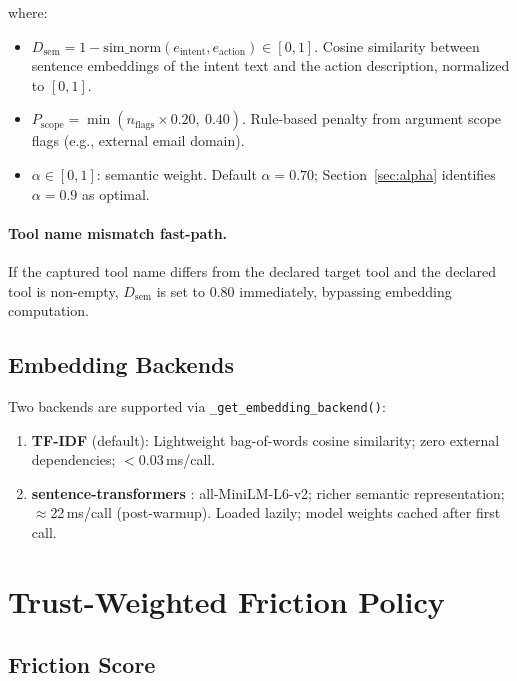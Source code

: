 \documentclass[11pt,letterpaper]{article}
\begin{document}
where:

\begin{itemize}
  \item $D_{\mathrm{sem}} = 1 - \mathrm{sim\_norm}(e_{\mathrm{intent}},
    e_{\mathrm{action}}) \in [0,1]$. Cosine similarity between sentence
    embeddings of the intent text and the action description, normalized to
    $[0,1]$.
  \item $P_{\mathrm{scope}} = \min(n_{\mathrm{flags}} \times 0.20,\ 0.40)$.
    Rule-based penalty from argument scope flags (e.g., external email domain).
  \item $\alpha \in [0,1]$: semantic weight. Default $\alpha = 0.70$;
    Section~\ref{sec:alpha} identifies $\alpha = 0.9$ as optimal.
\end{itemize}

\paragraph{Tool name mismatch fast-path.}
If the captured tool name differs from the declared target tool and the
declared tool is non-empty, $D_{\mathrm{sem}}$ is set to $0.80$ immediately,
bypassing embedding computation.

\subsection{Embedding Backends}

Two backends are supported via \texttt{\_get\_embedding\_backend()}:
\begin{enumerate}
  \item \textbf{TF-IDF} (default): Lightweight bag-of-words cosine similarity;
    zero external dependencies; $<0.03$\,ms/call.
  \item \textbf{sentence-transformers} \citep{Reimers2019SentenceBERT}:
    all-MiniLM-L6-v2; richer semantic representation; $\approx$22\,ms/call
    (post-warmup). Loaded lazily; model weights cached after first call.
\end{enumerate}

\section{Trust-Weighted Friction Policy}
\label{sec:policy}

\subsection{Friction Score}
\end{document}
